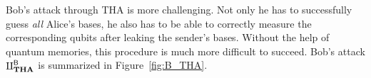 Bob's attack through THA is more challenging. Not only he has to successfully guess \textit{all} Alice's bases, he also has to be able to correctly measure the corresponding qubits after leaking the sender's bases. Without the help of quantum memories, this procedure is much more difficult to succeed. %
Bob's attack $\rotPi^{\mathsf{B}}_{\textbf{THA}}$ is summarized in Figure~\ref{fig:B_THA}.








